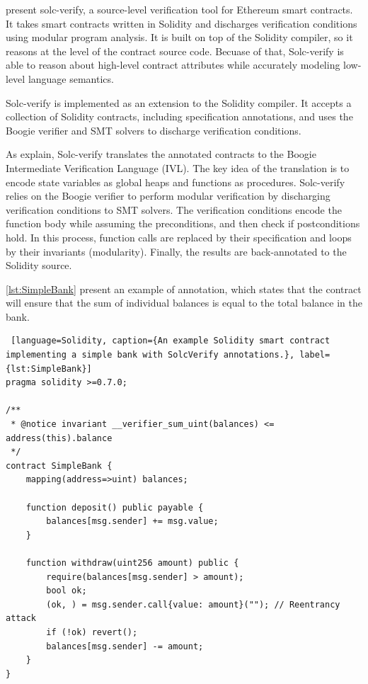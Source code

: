 \citet{SolcVerify} present solc-verify, a source-level verification tool for
Ethereum smart contracts. It takes smart contracts written
in Solidity and discharges verification conditions using modular program
analysis. It is built on top of the Solidity compiler, so it reasons at the level of the contract source code. 
Becuase of that, Solc-verify is able to reason about high-level contract attributes 
while accurately modeling low-level language semantics.

Solc-verify is implemented as an extension to the Solidity compiler.
It accepts a collection of Solidity contracts, including specification annotations, and uses 
the Boogie verifier and SMT solvers to discharge verification conditions. 

As \citet{SolcVerify_2} explain, Solc-verify translates the annotated contracts to the Boogie Intermediate Verification
Language (IVL). The key idea of the translation is to encode state variables as global heaps
and functions as procedures. Solc-verify relies on the Boogie verifier to perform modular
verification by discharging verification conditions to SMT solvers. The verification conditions
encode the function body while assuming the preconditions, and then check if postconditions
hold. In this process, function calls are replaced by their specification and loops by their
invariants (modularity). Finally, the results are back-annotated to the Solidity source.

\autoref{lst:SimpleBank} present an example of annotation, which states that the contract will ensure
that the sum of individual balances is equal to the total balance in the bank.


\begin{lstlisting} [language=Solidity, caption={An example Solidity smart contract implementing a simple bank with SolcVerify annotations.}, label={lst:SimpleBank}]
pragma solidity >=0.7.0;

/**
 * @notice invariant __verifier_sum_uint(balances) <= address(this).balance
 */
contract SimpleBank {
    mapping(address=>uint) balances;

    function deposit() public payable {
        balances[msg.sender] += msg.value;
    }

    function withdraw(uint256 amount) public {
        require(balances[msg.sender] > amount);
        bool ok;
        (ok, ) = msg.sender.call{value: amount}(""); // Reentrancy attack
        if (!ok) revert();
        balances[msg.sender] -= amount;
    }
}
\end{lstlisting}




